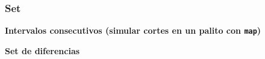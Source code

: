 \subsubsection{Set}
    \textbf{Intervalos consecutivos (simular cortes en un palito con \texttt{map})}
    

    \textbf{Set de diferencias}
    